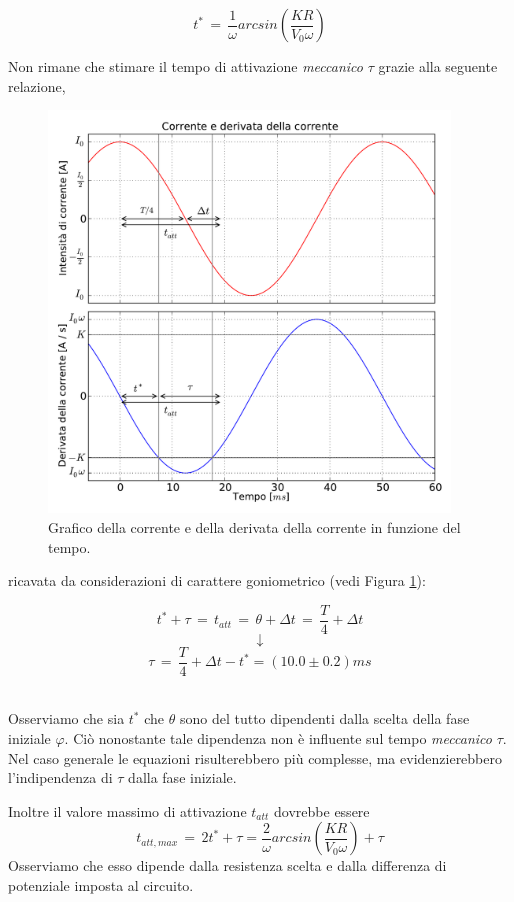 \begin{equation}
t^* \, = \, \frac{1}{\omega}arcsin\left(\frac{K R}{V_0 \omega}\right)
\label{eq:t_star}
\end{equation}

Non rimane che stimare il tempo di attivazione \emph{meccanico} $\tau$ grazie alla seguente relazione,
\begin{figure}
	\centering
    \includegraphics[height=4.2in]{gon.pdf}
    \caption{Grafico della corrente e della derivata della corrente in funzione del tempo.}
    \label{fig:gon}
\end{figure}
ricavata da considerazioni di carattere goniometrico (vedi Figura \ref{fig:gon}):\\

\noindent
\begin{minipage}{0.38\textwidth}
\begin{equation*}
t^* + \tau \,= \, t_{att} \, = \, \theta + \Delta t \, =\,\frac{T}{4} + \Delta t
\end{equation*}
\begin{equation*}
\downarrow
\end{equation*}
\begin{equation}
\tau \, = \, \frac{T}{4} + \Delta t - t^* = (10.0 \pm 0.2) ms
\label{eq:times}
\end{equation}
\end{minipage}\\

Osserviamo che sia $t^*$ che $\theta$ sono del tutto dipendenti dalla scelta della fase iniziale $\varphi$. Ciò nonostante tale dipendenza non è influente sul tempo \emph{meccanico} $\tau$. Nel caso generale le equazioni risulterebbero più complesse, ma evidenzierebbero l'indipendenza di $\tau$ dalla fase iniziale.

Inoltre il valore massimo di attivazione $t_{att}$ dovrebbe essere
\begin{equation*}
	t_{att,max} \,=\, 2 t^* + \tau = \frac{2}{\omega}arcsin\left(\frac{KR}{V_0 \omega}\right) + \tau
\end{equation*}
Osserviamo che esso dipende dalla resistenza scelta e dalla differenza di potenziale imposta al circuito.
